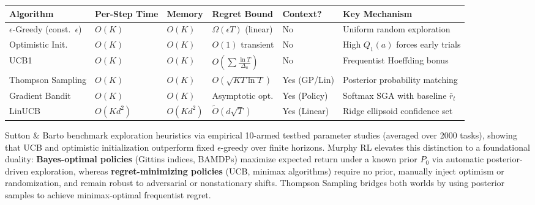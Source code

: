 \documentclass[../../../../master.tex]{subfiles}
\begin{document}
\begin{center}
\small
\begin{tabularx}{\textwidth}{@{}l l l l l X@{}}
\toprule
\textbf{Algorithm} & \textbf{Per-Step Time} & \textbf{Memory} & \textbf{Regret Bound} & \textbf{Context?} & \textbf{Key Mechanism} \\
\midrule
$\epsilon$-Greedy (const.\ $\epsilon$) & $O(K)$ & $O(K)$ & $\Omega(\epsilon T)$ (linear) & No & Uniform random exploration \\
Optimistic Init. & $O(K)$ & $O(K)$ & $O(1)$ transient & No & High $Q_1(a)$ forces early trials \\
UCB1 & $O(K)$ & $O(K)$ & $O\!\left(\sum \frac{\ln T}{\Delta_a}\right)$ & No & Frequentist Hoeffding bonus \\
Thompson Sampling & $O(K)$ & $O(K)$ & $O(\sqrt{KT\ln T})$ & Yes (GP/Lin) & Posterior probability matching \\
Gradient Bandit & $O(K)$ & $O(K)$ & Asymptotic opt. & Yes (Policy) & Softmax SGA with baseline $\bar{r}_t$ \\
LinUCB & $O(Kd^2)$ & $O(Kd^2)$ & $\tilde{O}(d\sqrt{T})$ & Yes (Linear) & Ridge ellipsoid confidence set \\
\bottomrule
\end{tabularx}
\label{tab:bandit:complexity}
\end{center}

\begin{crossbook}
Sutton \& Barto  benchmark exploration heuristics via empirical 10-armed testbed parameter studies (averaged over 2000 tasks), showing that UCB and optimistic initialization outperform fixed $\epsilon$-greedy over finite horizons. Murphy RL  elevates this distinction to a foundational duality: \textbf{Bayes-optimal policies} (Gittins indices, BAMDPs) maximize expected return under a known prior $P_0$ via automatic posterior-driven exploration, whereas \textbf{regret-minimizing policies} (UCB, minimax algorithms) require no prior, manually inject optimism or randomization, and remain robust to adversarial or nonstationary shifts. Thompson Sampling bridges both worlds by using posterior samples to achieve minimax-optimal frequentist regret.
\end{crossbook}
\end{document}

